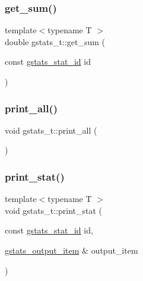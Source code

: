 \subsubsection{\texorpdfstring{get\+\_\+sum()}{get\_sum()}}
{\footnotesize\ttfamily template$<$typename T $>$ \\
double gstats\+\_\+t\+::get\+\_\+sum (\begin{DoxyParamCaption}\item[{const \hyperlink{gstats_8h_a662beb90f6d56f5ee9df4d812d39aa33}{gstats\+\_\+stat\+\_\+id}}]{id }\end{DoxyParamCaption})\hspace{0.3cm}{\ttfamily [inline]}}

\mbox{\label{classgstats__t_acf55dea2c0abe2dd5564f23a53c4fd15}} 
\subsubsection{\texorpdfstring{print\+\_\+all()}{print\_all()}}
{\footnotesize\ttfamily void gstats\+\_\+t\+::print\+\_\+all (\begin{DoxyParamCaption}{ }\end{DoxyParamCaption})\hspace{0.3cm}{\ttfamily [inline]}}

\mbox{\label{classgstats__t_aa7a55d9e67eeff816ed6cafc3ead608f}} 
\subsubsection{\texorpdfstring{print\+\_\+stat()}{print\_stat()}}
{\footnotesize\ttfamily template$<$typename T $>$ \\
void gstats\+\_\+t\+::print\+\_\+stat (\begin{DoxyParamCaption}\item[{const \hyperlink{gstats_8h_a662beb90f6d56f5ee9df4d812d39aa33}{gstats\+\_\+stat\+\_\+id}}]{id,  }\item[{\hyperlink{classgstats__output__item}{gstats\+\_\+output\+\_\+item} \&}]{output\+\_\+item }\end{DoxyParamCaption})\hspace{0.3cm}{\ttfamily [inline]}}


